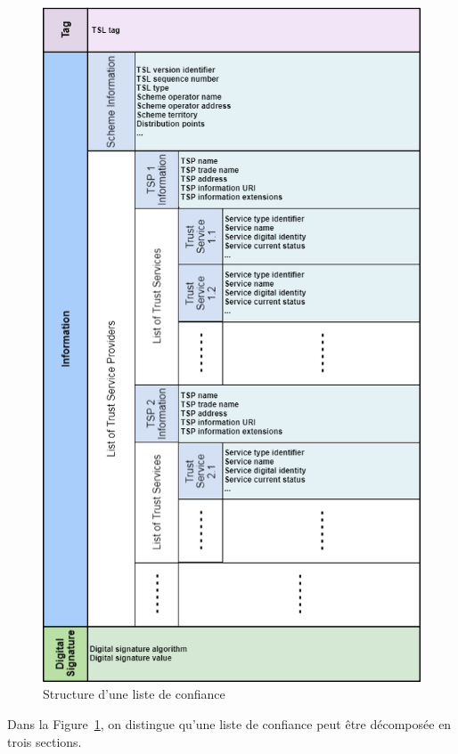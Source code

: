 \documentclass{tnreport}
\begin{document}
\begin{figure}[h]
	\centering
	\includegraphics[scale=0.65]{figures/tsl-scheme}
	\caption{Structure d'une liste de confiance}
	\label{fig:tsl-scheme}
\end{figure}

\clearpage

Dans la Figure~\ref{fig:tsl-scheme}, on distingue qu'une liste de confiance peut être décomposée en trois sections. 
\end{document}
